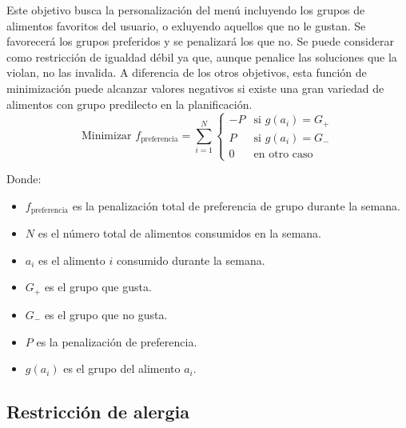 Este objetivo busca la personalización del menú incluyendo los grupos de alimentos favoritos del usuario, o exluyendo aquellos que no le gustan. Se favorecerá los grupos preferidos y se penalizará los que no. Se puede considerar como restricción de igualdad débil ya que, aunque penalice las soluciones que la violan, no las invalida. A diferencia de los otros objetivos, esta función de minimización puede alcanzar valores negativos si existe una gran variedad de alimentos con grupo predilecto en la planificación.
\[
\text{Minimizar } f_{\text{preferencia}} = \sum_{i=1}^{N}
\begin{cases} 
-P & \text{si } g(a_i) = G_+ \\
P & \text{si } g(a_i) = G_- \\
0 & \text{en otro caso}
\end{cases}
\]
\begin{small}
    Donde:
    \begin{itemize}
    \item \( f_{\text{preferencia}} \) es la penalización total de preferencia de grupo durante la semana.
    \item \( N \) es el número total de alimentos consumidos en la semana.
    \item \( a_i \) es el alimento \( i \) consumido durante la semana.
    \item \( G_+ \) es el grupo que gusta.
    \item \( G_- \) es el grupo que no gusta.
    \item \( P \) es la penalización de preferencia.
    \item \( g(a_i) \) es el grupo del alimento \( a_i \).
    \end{itemize}
\end{small}

\subsection{Restricción de alergia}

